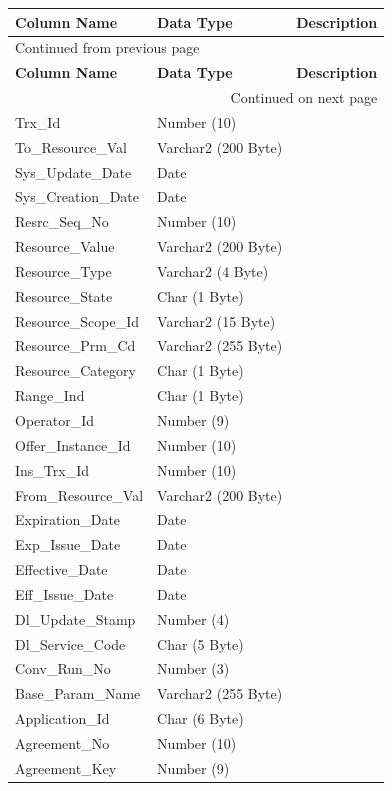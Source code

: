 \documentclass[12pt,twoside]{article}
\begin{document}
\begin{longtable}{l|l|l}
\hline
\textbf{Column Name} & \textbf{Data Type} & \textbf{Description}\\
\hline
\endfirsthead
\multicolumn{3}{l}{Continued from previous page} \\
\hline

\textbf{Column Name} & \textbf{Data Type} & \textbf{Description} \\

\hline
\endhead
\hline\multicolumn{3}{r}{Continued on next page} \\
\endfoot
\endlastfoot
\hline
Trx\_Id & Number (10) & \\
To\_Resource\_Val & Varchar2 (200 Byte) & \\
Sys\_Update\_Date & Date & \\
Sys\_Creation\_Date & Date & \\
Resrc\_Seq\_No & Number (10) & \\
Resource\_Value & Varchar2 (200 Byte) & \\
Resource\_Type & Varchar2 (4 Byte) & \\
Resource\_State & Char (1 Byte) & \\
Resource\_Scope\_Id & Varchar2 (15 Byte) & \\
Resource\_Prm\_Cd & Varchar2 (255 Byte) & \\
Resource\_Category & Char (1 Byte) & \\
Range\_Ind & Char (1 Byte) & \\
Operator\_Id & Number (9) & \\
Offer\_Instance\_Id & Number (10) & \\
Ins\_Trx\_Id & Number (10) & \\
From\_Resource\_Val & Varchar2 (200 Byte) & \\
Expiration\_Date & Date & \\
Exp\_Issue\_Date & Date & \\
Effective\_Date & Date & \\
Eff\_Issue\_Date & Date & \\
Dl\_Update\_Stamp & Number (4) & \\
Dl\_Service\_Code & Char (5 Byte) & \\
Conv\_Run\_No & Number (3) & \\
Base\_Param\_Name & Varchar2 (255 Byte) & \\
Application\_Id & Char (6 Byte) & \\
Agreement\_No & Number (10) & \\
Agreement\_Key & Number (9) & \\
\hline
\end{longtable}
\end{document}
